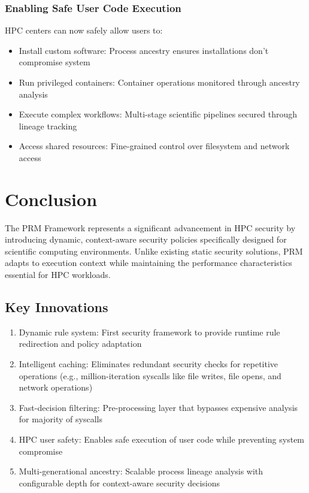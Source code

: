 \documentclass[conference]{IEEEtran}
\begin{document}
\subsubsection{Enabling Safe User Code Execution}
HPC centers can now safely allow users to:
\begin{itemize}
\item Install custom software: Process ancestry ensures installations don't compromise system
\item Run privileged containers: Container operations monitored through ancestry analysis
\item Execute complex workflows: Multi-stage scientific pipelines secured through lineage tracking
\item Access shared resources: Fine-grained control over filesystem and network access
\end{itemize}

\section{Conclusion}
\label{sec:conclusion}

The PRM Framework represents a significant advancement in HPC security by introducing dynamic, context-aware security policies specifically designed for scientific computing environments. Unlike existing static security solutions, PRM adapts to execution context while maintaining the performance characteristics essential for HPC workloads.

\subsection{Key Innovations}
\begin{enumerate}
\item Dynamic rule system: First security framework to provide runtime rule redirection and policy adaptation
\item Intelligent caching: Eliminates redundant security checks for repetitive operations (e.g., million-iteration syscalls like file writes, file opens, and network operations)
\item Fast-decision filtering: Pre-processing layer that bypasses expensive analysis for majority of syscalls
\item HPC user safety: Enables safe execution of user code while preventing system compromise
\item Multi-generational ancestry: Scalable process lineage analysis with configurable depth for context-aware security decisions
\end{enumerate}
\end{document}
